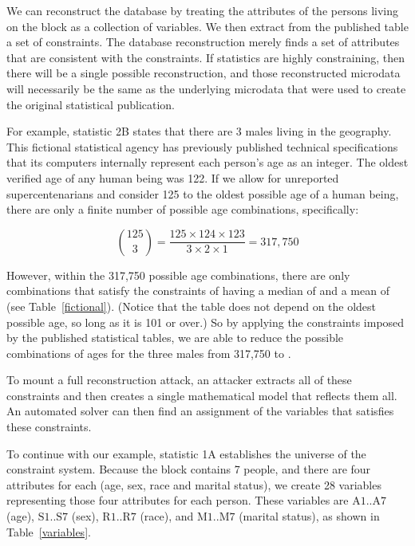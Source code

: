 \documentclass[runningheads]{llncs}
\begin{document}
We can reconstruct the database by treating the attributes
of the persons living on the block as a collection of 
variables. We then extract from the published table a set of
constraints. The database reconstruction merely finds a set of
attributes that are consistent with the constraints. If statistics are
highly constraining, then there will be a single possible
reconstruction, and those reconstructed microdata will necessarily be the same as the underlying
microdata that were used to create the original statistical publication.

For example, statistic 2B states that there are 3 males living in the
geography.  This fictional statistical agency has previously published technical
specifications that its computers internally represent each person's age as an
integer. The oldest verified age of any human being was
122\cite{whitney}. If we allow for unreported supercentenarians and
consider 125 to the oldest possible age of a human being, there
are only a finite number of possible age combinations, specifically:

\[ \binom{125}{3}=\frac{125 \times 124 \times 123}{3 \times 2 \times
  1} = 317,750 \]


However, within the 317,750 possible age combinations, there are
only \mycount{} combinations that satisfy the constraints of having a median
of \mymedian{} and a mean of \mymean{} (see
Table~\ref{fictional}). (Notice that the table does not depend on the
oldest possible age, so long as it is 101 or over.) So
by applying the constraints imposed by the published statistical
tables, we are able to reduce the possible combinations of ages for
the three males from 317,750 to \mycount.

To mount a full reconstruction attack, an attacker extracts all of these
constraints and then creates a
single mathematical model that reflects them all. An automated solver can then
find an assignment of the variables that satisfies these constraints. 

To continue with our example, statistic 1A establishes the universe of
the constraint system. Because the block contains 7 people, and there
are four attributes for each (age, sex, race and marital status), we
create 28 variables representing those four attributes for each
person. These variables are $\textrm{A}1..\textrm{A}7$ (age),
$\textrm{S}1..\textrm{S}7$ (sex), $\textrm{R}1..\textrm{R}7$ (race),
and $\textrm{M}1..\textrm{M}7$ (marital status), as shown in
Table~\ref{variables}.
\end{document}
